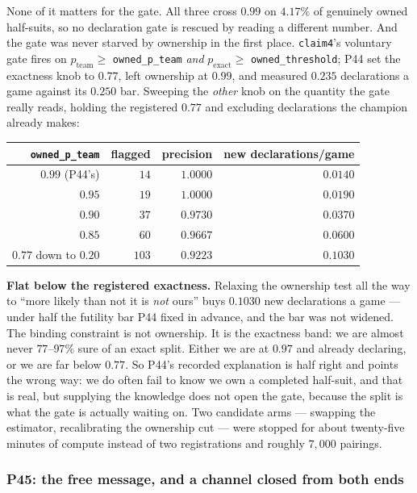 \documentclass[11pt,letterpaper]{article}
\begin{document}
None of it matters for the gate. All three cross $0.99$ on $\mathbf{4.17\%}$ of
genuinely owned half-suits, so no declaration gate is rescued by reading a
different number. And the gate was never starved by ownership in the first
place. \texttt{claim4}'s voluntary gate fires on $p_{\text{team}} \ge$
\texttt{owned\_p\_team} \emph{and} $p_{\text{exact}} \ge$
\texttt{owned\_threshold}; P44 set the exactness knob to $0.77$, left
ownership at $0.99$, and measured $0.235$ declarations a game against its
$0.250$ bar. Sweeping the \emph{other} knob on the quantity the gate really
reads, holding the registered $0.77$ and excluding declarations the champion
already makes:

\begin{center}
\small
\begin{tabular}{rrrr}
\toprule
\texttt{owned\_p\_team} & flagged & precision & new declarations/game \\
\midrule
$0.99$ (P44's) & $14$ & $1.0000$ & $0.0140$ \\
$0.95$ & $19$ & $1.0000$ & $0.0190$ \\
$0.90$ & $37$ & $0.9730$ & $0.0370$ \\
$0.85$ & $60$ & $0.9667$ & $0.0600$ \\
$0.77$ down to $0.20$ & $103$ & $0.9223$ & $\mathbf{0.1030}$ \\
\bottomrule
\end{tabular}
\end{center}

\noindent \textbf{Flat below the registered exactness.} Relaxing the ownership
test all the way to ``more likely than not it is \emph{not} ours'' buys $0.1030$ new declarations
a game --- under half the futility bar P44 fixed in advance, and the bar was not
widened. The binding constraint is not ownership. It is the exactness band: we
are almost never $77$--$97\%$ sure of an exact split. Either we are at $0.97$
and already declaring, or we are far below $0.77$. So P44's recorded
explanation is half right and points the wrong way: we do often fail to know we
own a completed half-suit, and that is real, but supplying the knowledge does
not open the gate, because the split is what the gate is actually waiting on.
Two candidate arms --- swapping the estimator, recalibrating the ownership cut
--- were stopped for about twenty-five minutes of compute instead of two
registrations and roughly $7{,}000$ pairings.

\subsubsection{P45: the free message, and a channel closed from both ends}
\label{sec:p45}
\end{document}
